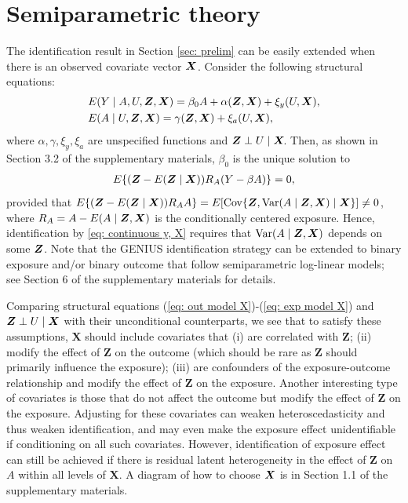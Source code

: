 \documentclass[12pt]{article}
\begin{document}
\vspace{-5mm}

\section{Semiparametric theory}
\label{sec: identification}
The identification result in Section \ref{sec: prelim} can be easily extended when there is an observed covariate vector $ \bm{X} $. Consider the following structural equations:
\begin{align}
	& E(Y\mid A,  U, \bm{Z}, \bm{X})=\beta_0A+ \alpha(\bm{Z}, \bm{X})   +\xi_y(U,\bm{X}),\label{eq: out model X}\\
	& E(A\mid U, \bm{Z}, \bm{X})= \gamma(\bm{Z}, \bm{X})+ \xi_a(U, \bm{X}),\label{eq: exp model X}
\end{align}
where $ \alpha, \gamma,  \xi_y, \xi_a$ are unspecified functions and $  \bm{Z}\perp U \mid  \bm{X}\!$. Then, as shown in Section 3.2 of the  supplementary materials,  $ \beta_0  $ is the unique solution to
\begin{align}
	E\{ (\bm{Z}- E(\bm{Z}\mid\bm{X})) R_A (Y- \beta A)\}=0, \label{eq: continuous y, X}
\end{align}
provided that $ E\{ (\bm{Z}- E(\bm{Z}\mid\bm{X})) R_AA \} =E[\mbox{Cov} \{  \bm{Z}, \mbox{Var} (A\mid\bm{Z}, \bm{X})\mid\bm{X} \}] \neq 0$, 	where  $ R_A=A- E(A\mid\bm{Z},\bm{X}) $ is the conditionally centered exposure. Hence,  identification by \eqref{eq: continuous y, X} requires that $ \mbox{Var}(A\mid\bm{Z}, \bm{X}) $ depends on some $ \bm{Z} $. Note that the GENIUS identification strategy can be extended to binary exposure and/or binary outcome that follow semiparametric log-linear models; see Section 6 of the supplementary materials for details.

{Comparing structural equations (\ref{eq: out model X})-(\ref{eq: exp model X}) and $ \bm{Z}\perp U \mid\bm{X} $ with their unconditional counterparts, we see that to satisfy these assumptions, $\bm X$ should include covariates that  (i) are correlated with $\bm Z $; (ii)  modify the effect of $\bm Z$ on the outcome (which should be rare as $\bm Z$ should primarily influence the exposure); (iii) are confounders of the exposure-outcome relationship and modify the effect of $\bm Z$ on the exposure. Another interesting type of covariates is those that do not affect the outcome but modify the effect of  $\bm Z$ on the exposure. Adjusting for these covariates can weaken heteroscedasticity and thus weaken identification, and may even make the exposure effect unidentifiable if conditioning on all such covariates. However, identification of exposure effect can still be achieved if there is residual latent heterogeneity in the effect of $\bm Z$ on $A$ within all levels of $\bm X$. A diagram of how to choose $\bm{X}$ is in Section 1.1 of the supplementary materials.
}
\end{document}
